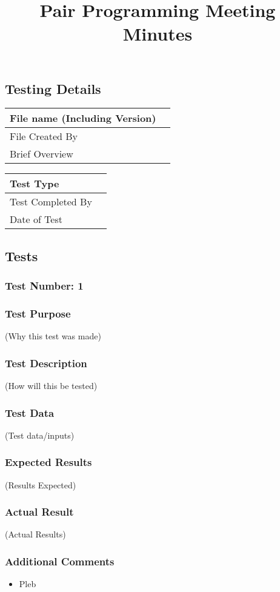 \documentclass{article}
\title{Pair Programming Meeting Minutes}
\date{}
\author{}
\begin{document}
\maketitle
    \subsection{Testing Details}
    \begin{center}
        \begin{tabular}{| p{5cm} | p{11.5cm} |}
            \hline
            File name (Including Version) & \\ \hline
            File Created By               & \\ \hline
            Brief Overview                & \\ \hline
        \end{tabular}
    \end{center}


    \begin{center}
        \begin{tabular}{| p{5cm} | p{11.5cm} |}
            \hline
            Test Type           & \\ \hline
            Test Completed By   & \\ \hline
            Date of Test        & \\ \hline
        \end{tabular}
    \end{center}

    
    \subsection{Tests}

    \subsubsection{Test Number: 1}
    \subsubsection{Test Purpose}
    (Why this test was made)


    \subsubsection{Test Description}
    (How will this be tested)

    
    \subsubsection{Test Data}
    (Test data/inputs)


    \subsubsection{Expected Results}
    (Results Expected)


    \subsubsection{Actual Result}
    (Actual Results)

    
    \subsubsection{Additional Comments}
    \begin{itemize}
        \item Pleb
    \end{itemize}
\end{document}
